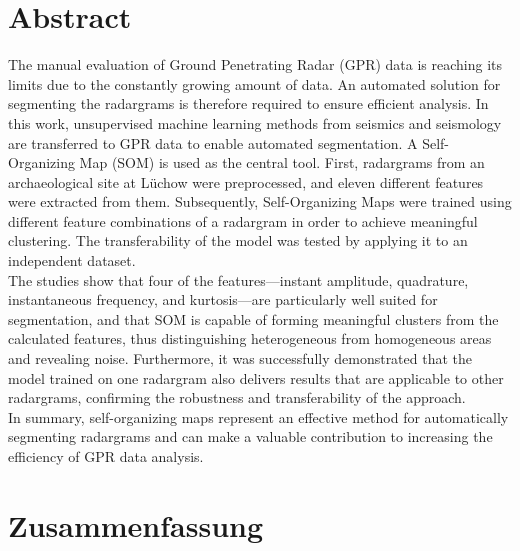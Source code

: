 \section*{Abstract}

The manual evaluation of Ground Penetrating Radar (GPR) data is reaching its limits due to the constantly growing amount of data. An automated solution for segmenting the radargrams is therefore required to ensure efficient analysis. In this work, unsupervised machine learning methods from seismics and seismology are transferred to GPR data to enable automated segmentation. A Self-Organizing Map (SOM) is used as the central tool. First, radargrams from an archaeological site at Lüchow were preprocessed, and eleven different features were extracted from them. Subsequently, Self-Organizing Maps were trained using different feature combinations of a radargram in order to achieve meaningful clustering. The transferability of the model was tested by applying it to an independent dataset. \\
The studies show that four of the features—instant amplitude, quadrature, instantaneous frequency, and kurtosis—are particularly well suited for segmentation, and that SOM is capable of forming meaningful clusters from the calculated features, thus distinguishing heterogeneous from homogeneous areas and revealing noise. Furthermore, it was successfully demonstrated that the model trained on one radargram also delivers results that are applicable to other radargrams, confirming the robustness and transferability of the approach.\\
In summary, self-organizing maps represent an effective method for automatically segmenting radargrams and can make a valuable contribution to increasing the efficiency of GPR data ana\-lysis.

\clearpage

\section*{Zusammenfassung}

